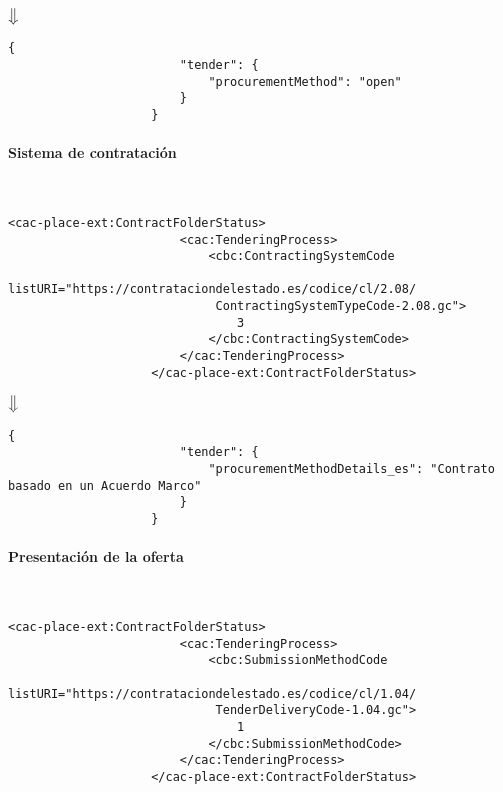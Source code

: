                 \begin{center}
                    $\big\Downarrow$
                \end{center}
                
                \begin{lstlisting}[language=lJSON]
                    {
                        "tender": {
                            "procurementMethod": "open"
                        }
                    }
                \end{lstlisting}
                
            \paragraph{Sistema de contratación} \mbox{}\\
                \begin{lstlisting}[language=lXML]
                    <cac-place-ext:ContractFolderStatus>
                        <cac:TenderingProcess>
                            <cbc:ContractingSystemCode
                             listURI="https://contrataciondelestado.es/codice/cl/2.08/
                             ContractingSystemTypeCode-2.08.gc">
                                3
                            </cbc:ContractingSystemCode>
                        </cac:TenderingProcess>
                    </cac-place-ext:ContractFolderStatus>
                \end{lstlisting}
                
                \begin{center}
                    $\big\Downarrow$
                \end{center}
                
                \begin{lstlisting}[language=lJSON]
                    {
                        "tender": {
                            "procurementMethodDetails_es": "Contrato basado en un Acuerdo Marco"
                        }
                    }
                \end{lstlisting}
                
            \paragraph{Presentación de la oferta} \mbox{}\\
                \begin{lstlisting}[language=lXML]
                    <cac-place-ext:ContractFolderStatus>
                        <cac:TenderingProcess>
                            <cbc:SubmissionMethodCode
                             listURI="https://contrataciondelestado.es/codice/cl/1.04/
                             TenderDeliveryCode-1.04.gc">
                                1
                            </cbc:SubmissionMethodCode>
                        </cac:TenderingProcess>
                    </cac-place-ext:ContractFolderStatus>
                \end{lstlisting}
                
